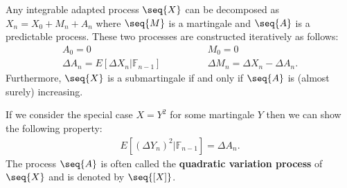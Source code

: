 
    \begin{theorem}
        Any integrable adapted process $\seq{X}$ can be decomposed as $X_n=X_0+M_n+A_n$ where $\seq{M}$ is a martingale and $\seq{A}$ is a predictable process. These two processes are constructed iteratively as follows:
        \begin{align}
            A_0 = 0\qquad&\qquad M_0 = 0\\
            \Delta A_n = E[\Delta X_n|\mathbb{F}_{n-1}]\qquad&\qquad\Delta M_n = \Delta X_n - \Delta A_n.
        \end{align}
        Furthermore, $\seq{X}$ is a submartingale if and only if $\seq{A}$ is (almost surely) increasing.
    \end{theorem}
    \begin{result}
        If we consider the special case $X=Y^2$ for some martingale $Y$ then we can show the following property:
        \begin{gather}
            E[(\Delta Y_n)^2|\mathbb{F}_{n-1}] = \Delta A_n.
        \end{gather}
        The process $\seq{A}$ is often called the \textbf{quadratic variation process} of $\seq{X}$ and is denoted by $\seq{[X]}$.
    \end{result}

